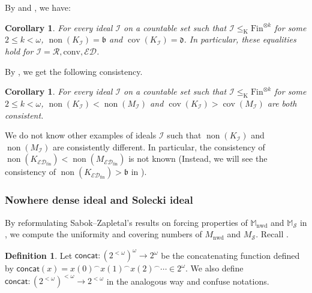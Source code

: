\documentclass[a4paper,12pt]{amsart}
\newtheorem{cor}[thm]{Corollary}
\theoremstyle{definition}
\newtheorem{dfn}[thm]{Definition}
\numberwithin{thm}{section}
\numberwithin{equation}{section}
\newcommand{\bb}{\mathfrak{b}}
\newcommand{\dd}{\mathfrak{d}}
\DeclareMathOperator{\non}{non}
\DeclareMathOperator{\cov}{cov}
\newcommand{\ed}{\mathcal{ED}}
\newcommand{\I}{\mathscr{I}}
\newcommand{\edfin}{\mathcal{ED}_\mathrm{fin}}
\newcommand{\nwd}{\mathrm{nwd}}
\newcommand{\conv}{\mathrm{conv}}
\newcommand{\cantor}{2^{\omega}}
\newcommand{\cantortree}{2^{<\omega}}
\newcommand{\RandomGraph}{\mathcal{R}}
\newcommand{\Solecki}{\mathcal{S}}
\begin{document}
    By  and , we have:
    
    \begin{cor}
        For every ideal $\I$ on a countable set such that $\I \leq_{\mathrm{K}} \mathrm{Fin}^{\otimes k}$ for some $2\leq k<\omega$, $\non(K_{\I})=\bb$ and $\cov(K_{\I})=\dd$. In particular, these equalities hold for $\I = \RandomGraph,\conv,\ed$.
    \end{cor}
    
    By , we get the following consistency.

    \begin{cor}
        For every ideal $\I$ on a countable set such that $\I \leq_{\mathrm{K}} \mathrm{Fin}^{\otimes k}$ for some $2\leq k<\omega$, $\non(K_\I)<\non(M_\I)$ and $\cov(K_\I)>\cov(M_\I)$ are both consistent.
    \end{cor}

    We do not know other examples of ideals $\I$ such that $\non(K_\I)$ and $\non(M_\I)$ are consistently different. In particular, the consistency of $\non(K_{\edfin})<\non(M_{\edfin})$ is not known (Instead, we will see the consistency of $\non(K_{\edfin}) > \bb$ in ).


    \subsubsection{Nowhere dense ideal and Solecki ideal}

    By reformulating Sabok--Zapletal's results on forcing properties of $\mathbb{M}_\nwd$ and $\mathbb{M}_\Solecki$ in \cite{SZ11}, we compute the uniformity and covering numbers of $M_\nwd$ and $M_\Solecki$. Recall .
    
    \begin{dfn}\label{dfn:concat_func}
         Let $\mathsf{concat}\colon (\cantortree)^\omega \rightarrow \cantor$ be the concatenating function defined by $\mathsf{concat}(x) = x(0) ^\frown x(1) ^\frown x(2) ^\frown \cdots\in2^\omega$. We also define $\mathsf{concat}\colon (2^{<\omega})^{<\omega}\to 2^{<\omega}$ in the analogous way and confuse notations.
    \end{dfn}
\end{document}
